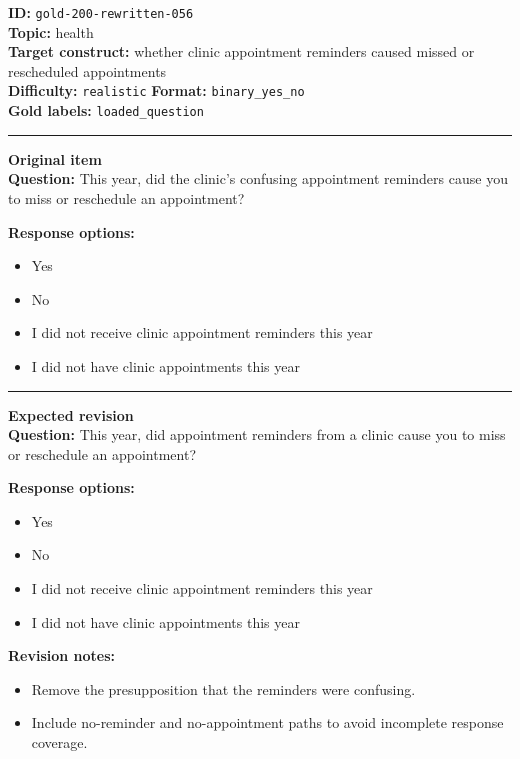 \documentclass[10pt,a4paper]{article}
\newcommand{\sectionline}{\vspace{0.15em}\hrule\vspace{0.35em}}
\begin{document}
\begin{tcolorbox}[colframe=FlawRed,colback=white,colbacktitle=FlawRed!9,coltitle=black,title={Item 056\hfill Flawed item}]
\textbf{ID:} \texttt{gold-200-rewritten-056}\\
\textbf{Topic:} health\\
\textbf{Target construct:} whether clinic appointment reminders caused missed or rescheduled appointments\\
\textbf{Difficulty:} \texttt{realistic} \quad \textbf{Format:} \texttt{binary\_yes\_no}\\
\textbf{Gold labels:} \texttt{loaded\_question}\\
\sectionline
\textbf{Original item}\\
\textbf{Question:} This year, did the clinic's confusing appointment reminders cause you to miss or reschedule an appointment?
\par\textbf{Response options:}
\begin{itemize}
\item Yes
\item No
\item I did not receive clinic appointment reminders this year
\item I did not have clinic appointments this year
\end{itemize}
\sectionline
\textbf{Expected revision}\\
\textbf{Question:} This year, did appointment reminders from a clinic cause you to miss or reschedule an appointment?
\par\textbf{Response options:}
\begin{itemize}
\item Yes
\item No
\item I did not receive clinic appointment reminders this year
\item I did not have clinic appointments this year
\end{itemize}
\par\textbf{Revision notes:}
\begin{itemize}
\item Remove the presupposition that the reminders were confusing.
\item Include no-reminder and no-appointment paths to avoid incomplete response coverage.
\end{itemize}
\end{tcolorbox}
\end{document}
